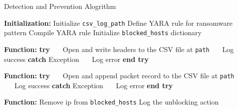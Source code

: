 \documentclass[12pt,letterpaper]{article}
\begin{document}
\begin{algorithm}
\caption{Detection and Prevention Alogrithm}
\begin{algorithmic}[1]
\State {}
    \State \textbf{Initialization:}
    \State Initialize \texttt{csv\_log\_path}
    \State Define YARA rule for ransomware pattern
    \State Compile YARA rule
    \State Initialize \texttt{blocked\_hosts} dictionary

\State {}
    \State \textbf{Function:} 
    \State \textbf{try}
    \State \ \ \ Open and write headers to the CSV file at \texttt{path}
    \State \ \ \ Log success
    \State \textbf{catch} Exception
    \State \ \ \ Log error
    \State \textbf{end try}

\State {}
    \State \textbf{Function:}
    \State \textbf{try}
    \State \ \ \ Open and append packet record to the CSV file at \texttt{path}
    \State \ \ \ Log success
    \State \textbf{catch} Exception
    \State \ \ \ Log error
    \State \textbf{end try}

\State {}
    \State \textbf{Function:}
        \State Remove ip from \texttt{blocked\_hosts}
        \State Log the unblocking action
    \EndIf
    \end{algorithmic}
    \end{algorithm}
\end{document}
